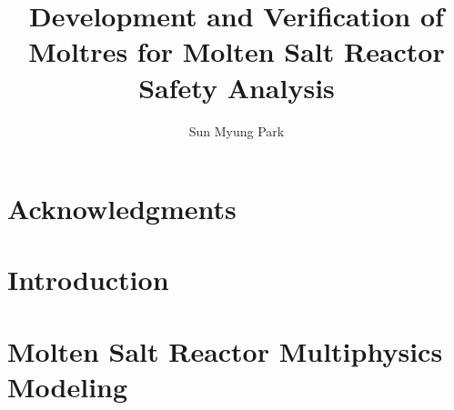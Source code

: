 \documentclass[edeposit,fullpage,11pt]{uiucthesis2018}
\title{Development and Verification of Moltres for Molten
Salt Reactor Safety Analysis}
\author{Sun Myung Park}
\begin{document}
\maketitle

\frontmatter
\begin{abstract}

%

\end{abstract}

\chapter*{Acknowledgments}

%


\tableofcontents
\listoftables
\listoffigures

\printglossary[title=List of Abbreviations,type=\acronymtype,nonumberlist,
nogroupskip=true]

\pagebreak
\mainmatter
\glsresetall

\chapter{Introduction}
\label{chap:intro}

\glsresetall

\chapter{Molten Salt Reactor Multiphysics Modeling}
\label{chap:lit}

\glsresetall
\end{document}
